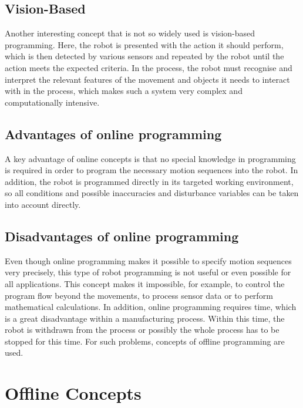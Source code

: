 \documentclass[conference]{IEEEtran}
\begin{document}
    \subsection{Vision-Based}
        Another interesting concept that is not so widely used is vision-based programming. Here, the robot is presented with the action it should perform, which is then detected by various sensors and repeated by the robot until the action meets the expected criteria. %
        In the process, the robot must recognise and interpret the relevant features of the movement and objects it needs to interact with in the process, %
        which makes such a system very complex and computationally intensive. %

    \subsection{Advantages of online programming}
        A key advantage of online concepts is that no special knowledge in programming is required in order to program the necessary motion sequences into the robot. In addition, the robot is programmed directly in its targeted working environment, so all conditions and possible inaccuracies and disturbance variables can be taken into account directly. %

    \subsection{Disadvantages of online programming}
        Even though online programming makes it possible to specify motion sequences very precisely, this type of robot programming is not useful or even possible for all applications. This concept makes it impossible, for example, to control the program flow beyond the movements, to process sensor data or to perform mathematical calculations. In addition, online programming requires time, which is a great disadvantage within a manufacturing process. Within this time, the robot is withdrawn from the process or possibly the whole process has to be stopped for this time. For such problems, concepts of offline programming are used. %

\section{Offline Concepts}
\end{document}
